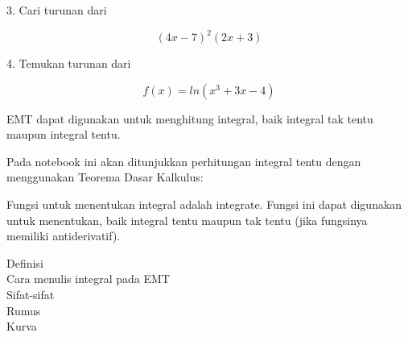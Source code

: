 \documentclass[a4paper,10pt]{article}
\begin{document}
\begin{eulernotebook}
\begin{eulercomment}
\begin{eulercomment}
\begin{eulercomment}
\begin{eulercomment}
\begin{eulercomment}
\begin{eulercomment}
\begin{eulercomment}
\begin{eulercomment}
\begin{eulercomment}
\begin{eulercomment}
\begin{eulercomment}
\begin{eulercomment}
\begin{eulercomment}
\begin{eulercomment}
\begin{eulercomment}
\begin{eulercomment}
\begin{eulercomment}
\begin{eulercomment}
\begin{eulercomment}
\begin{eulercomment}
\begin{euleroutput}
\end{euleroutput}
\begin{eulercomment}
3. Cari turunan dari\\
\end{eulercomment}
\begin{eulerformula}
\[
(4x-7)^2(2x+3)
\]
\end{eulerformula}
\begin{eulercomment}
4. Temukan turunan dari\\
\end{eulercomment}
\begin{eulerformula}
\[
f(x)=ln(x^3+3x-4)
\]
\end{eulerformula}
\begin{eulercomment}
\begin{eulercomment}
\begin{eulercomment}
EMT dapat digunakan untuk menghitung integral, baik integral tak tentu
maupun integral tentu.

Pada notebook ini akan ditunjukkan perhitungan integral tentu dengan
menggunakan Teorema Dasar Kalkulus:


Fungsi untuk menentukan integral adalah integrate. Fungsi ini dapat
digunakan untuk menentukan, baik integral tentu maupun tak tentu (jika
fungsinya memiliki antiderivatif).


\end{eulercomment}
\begin{eulercomment}
Definisi\\
Cara menulis integral pada EMT\\
Sifat-sifat\\
Rumus\\
Kurva


\end{eulercomment}
\end{eulercomment}
\end{eulercomment}
\end{eulercomment}
\end{eulercomment}
\end{eulercomment}
\end{eulercomment}
\end{eulercomment}
\end{eulercomment}
\end{eulercomment}
\end{eulercomment}
\end{eulercomment}
\end{eulercomment}
\end{eulercomment}
\end{eulercomment}
\end{eulercomment}
\end{eulercomment}
\end{eulercomment}
\end{eulercomment}
\end{eulercomment}
\end{eulercomment}
\end{eulercomment}
\end{eulercomment}
\end{eulernotebook}
\end{document}
